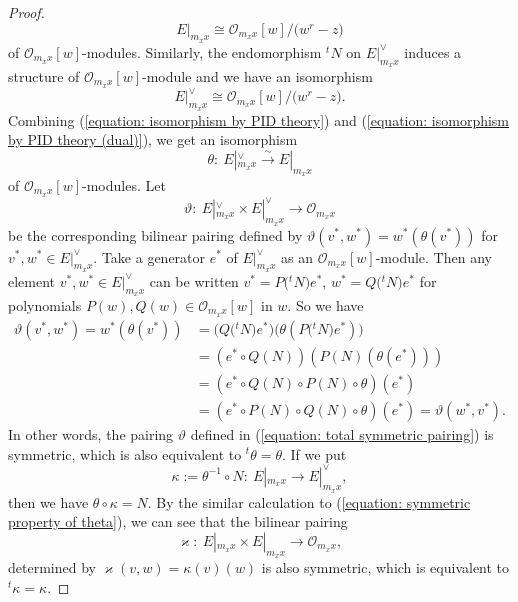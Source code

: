 \documentclass[pdftex]{sigma}
\numberwithin{equation}{section}
\begin{document}
\begin{proof}
\begin{equation}
 E|_{m_xx}\cong{\mathcal O}_{m_xx}[w]/\big(w^r-z\big)
\end{equation}
of ${\mathcal O}_{m_xx}[w]$-modules.
Similarly, the endomorphism
$^tN$ on $E|_{m_xx}^{\vee}$
induces a structure of ${\mathcal O}_{m_xx}[w]$-module and we have an isomorphism
\begin{equation} \label{equation: isomorphism by PID theory (dual)}
 E|_{m_xx}^{\vee}\cong{\mathcal O}_{m_xx}[w]/\big(w^r-z\big).
\end{equation}
Combining (\ref{equation: isomorphism by PID theory}) and
(\ref{equation: isomorphism by PID theory (dual)}),
we get an isomorphism
\[
 \theta\colon \ E|_{m_xx}^{\vee} \stackrel{\sim}\longrightarrow E|_{m_xx}
\]
of ${\mathcal O}_{m_xx}[w]$-modules.
Let
\begin{equation} \label{equation: total symmetric pairing}
 \vartheta\colon \
 E|_{m_xx}^{\vee} \times E|_{m_xx}^{\vee} \longrightarrow {\mathcal O}_{m_xx}
\end{equation}
be the corresponding bilinear pairing defined by
$\vartheta(v^*,w^*)=w^*(\theta(v^*))$
for $v^*,w^*\in E|_{m_xx}^{\vee}$.
Take a generator $e^*$ of $E|_{m_xx}^{\vee}$
as an ${\mathcal O}_{m_xx}[w]$-module.
Then any element $v^*,w^*\in E|_{m_xx}^{\vee}$
can be written $v^*=P\big({}^tN\big)e^*$, $w^*=Q\big({}^tN\big)e^*$
for polynomials $P(w),Q(w)\in{\mathcal O}_{m_xx}[w]$ in $w$.
So we have
\begin{align}
 \vartheta(v^*,w^*)=w^*(\theta(v^*))
 & =
 \big(Q\big({}^tN\big)e^*\big) \big(\theta(P\big({}^tN\big)e^*)\big)\nonumber \\
 &=
 (e^*\circ Q(N)) (P(N)(\theta(e^*)))\nonumber\\
 &=
 (e^*\circ Q(N)\circ P(N)\circ \theta) (e^*)\nonumber \\
 &= (e^*\circ P(N)\circ Q(N)\circ \theta) (e^*)
 =\vartheta(w^*,v^*). \label{equation: symmetric property of theta}
\end{align}
In other words, the pairing $\vartheta$ defined in (\ref{equation: total symmetric pairing})
is symmetric,
which is also equivalent to $^t\theta=\theta$.
If we put
\[
 \kappa:=\theta^{-1}\circ N \colon \
 E|_{m_xx} \longrightarrow E|_{m_xx}^{\vee},
\]
then we have $\theta\circ\kappa=N$.
By the similar calculation to (\ref{equation: symmetric property of theta}),
we can see that the bilinear pairing
\[
 \varkappa \colon \ E|_{m_xx} \times E|_{m_xx}
 \longrightarrow {\mathcal O}_{m_xx},
\]
determined by $\varkappa(v,w)=\kappa(v)(w)$ is also symmetric,
which is equivalent to $^t\kappa=\kappa$.


\end{proof}
\end{document}
